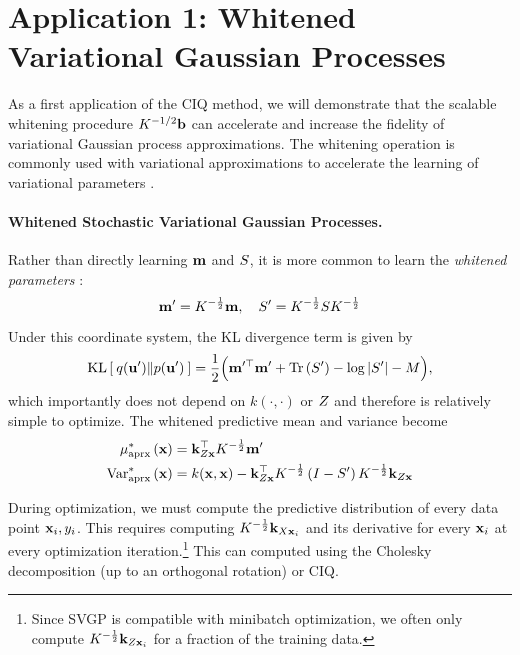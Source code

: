 \section{Application 1: Whitened Variational Gaussian Processes}
\label{sec:variational_results}

As a first application of the CIQ method, we will demonstrate that the scalable whitening procedure $K^{-1/2} \mathbf{b}$ can accelerate and increase the fidelity of variational Gaussian process approximations.
The whitening operation is commonly used with variational approximations to accelerate the learning of variational parameters \cite{matthews2017gpflow}.


\paragraph{Whitened Stochastic Variational Gaussian Processes.}
Rather than directly learning $\mathbf{m}$ and $S$, it is more common to learn the \emph{whitened parameters} \cite{kuss2005assessing,matthews2017scalable}:
\[ \mathbf{m}' = K^{-\frac 1 2} \mathbf{m}, \quad S' = K^{-\frac 1 2} S K^{-\frac 1 2} \]
Under this coordinate system, the KL divergence term is given by
%
\begin{equation}
	\kl{ q(\bu') }{ p(\bu') } = \frac{1}{2} \Bigl( \bm^{\prime \top} \bm' + \tr{ \bS' } - \log \vert \bS' \vert - M \Bigr),
	\label{eqn:kldiv_whitened}
\end{equation}
%
which importantly does not depend on $k(\cdot,\cdot)$ or $Z$ and therefore is relatively simple to optimize.
The whitened predictive mean and variance become
%
\begin{align}
  \mu^*_\text{aprx} \left( \mathbf{x} \right) &= \mathbf{k}_{Z\mathbf{x}}^\top K^{-\frac 1 2} \mathbf{m}'
  \label{eqn:approx_pred_mean} \\
  \text{Var}^*_\text{aprx} \left( \mathbf{x} \right) &= k(\mathbf{x}, \mathbf{x}) -
    \mathbf{k}_{Z\mathbf{x}}^\top K^{-\frac 1 2} \left( I - S' \right) K^{-\frac 1 2} \mathbf{k}_{Z\mathbf{x}}
  \label{eqn:approx_pred_covar}
\end{align}

During optimization, we must compute the predictive distribution of every data point $\mathbf{x}_i, y_i$.
This requires computing $K^{- \frac 1 2} \mathbf{k}_{X \mathbf{x}_i}$ and its derivative for every $\mathbf{x}_i$ at every optimization iteration.\footnote{
  Since SVGP is compatible with minibatch optimization, we often only compute $K^{- \frac 1 2} \mathbf{k}_{Z \mathbf{x}_i}$ for a fraction of the training data.
}
This can computed using the Cholesky decomposition (up to an orthogonal rotation) or CIQ.

